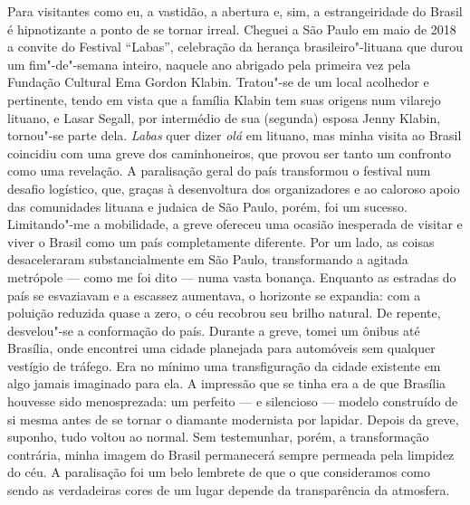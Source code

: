 Para visitantes como eu, a vastidão, a abertura e, sim, a
estrangeiridade do Brasil é hipnotizante a ponto de se tornar irreal.
Cheguei a São Paulo em maio de 2018 a convite do Festival ``Labas'',
celebração da herança brasileiro"-lituana que durou um fim"-de"-semana
inteiro, naquele ano abrigado pela primeira vez pela Fundação Cultural
Ema Gordon Klabin. Tratou"-se de um local acolhedor e pertinente, tendo
em vista que a família Klabin tem suas origens num vilarejo lituano, e
Lasar Segall, por intermédio de sua (segunda) esposa Jenny Klabin,
tornou"-se parte dela. \emph{Labas} quer dizer \emph{olá} em lituano, mas
minha visita ao Brasil coincidiu com uma greve dos caminhoneiros, que
provou ser tanto um confronto como uma revelação. A paralisação geral do
país transformou o festival num desafio logístico, que, graças à
desenvoltura dos organizadores e ao caloroso apoio das comunidades
lituana e judaica de São Paulo, porém, foi um sucesso. Limitando"-me a
mobilidade, a greve ofereceu uma ocasião inesperada de visitar e viver o
Brasil como um país completamente diferente. Por um lado, as coisas
desaceleraram substancialmente em São Paulo, transformando a agitada
metrópole --- como me foi dito --- numa vasta bonança. Enquanto as estradas
do país se esvaziavam e a escassez aumentava, o horizonte se expandia:
com a poluição reduzida quase a zero, o céu recobrou seu brilho natural.
De repente, desvelou"-se a conformação do país. Durante a greve, tomei um
ônibus até Brasília, onde encontrei uma cidade planejada para automóveis
sem qualquer vestígio de tráfego. Era no mínimo uma transfiguração da
cidade existente em algo jamais imaginado para ela. A impressão que se
tinha era a de que Brasília houvesse sido menosprezada: um perfeito --- e
silencioso --- modelo construído de si mesma antes de se tornar o diamante
modernista por lapidar. Depois da greve, suponho, tudo voltou ao normal.
Sem testemunhar, porém, a transformação contrária, minha imagem do
Brasil permanecerá sempre permeada pela limpidez do céu. A paralisação
foi um belo lembrete de que o que consideramos como sendo as verdadeiras
cores de um lugar depende da transparência da atmosfera.


